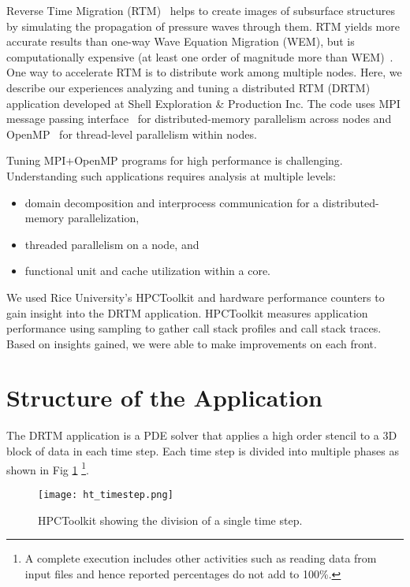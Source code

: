\documentclass[conference]{IEEEtran}
\begin{document}
Reverse Time Migration (RTM)~\cite{rtm} helps to create images of subsurface structures by simulating the propagation of pressure waves through them. RTM yields more accurate results than one-way Wave Equation Migration (WEM), but is computationally expensive (at least one order of magnitude more than WEM)~\cite{araya-polo}. One way to accelerate RTM is to distribute work among multiple nodes. Here, we describe our experiences analyzing and tuning a distributed RTM (DRTM) application developed at Shell Exploration \& Production Inc.
The code uses MPI message passing interface~\cite{mpi} for distributed-memory parallelism across nodes and OpenMP~\cite{openmp} for thread-level parallelism within nodes.

Tuning MPI+OpenMP programs for high performance is challenging. Understanding such applications requires analysis at multiple levels: 

\begin{itemize}
    \item domain decomposition and interprocess communication for a distributed-memory parallelization,
    \item threaded parallelism on a node, and
    \item functional unit and cache utilization within a core.
\end{itemize}

We used Rice University's HPCToolkit \cite{hpctoolkit} and hardware performance counters to gain insight into the DRTM application. HPCToolkit measures application performance using sampling to gather call stack profiles and call stack traces.
Based on insights gained, we were able to make improvements on each front.

\section{Structure of the Application}
The DRTM application is a PDE solver that applies a high order stencil to a 3D block of data in each time step. Each time step is divided into multiple phases as shown in Fig \ref{fig:ht_timestep} \footnote{A complete execution includes other activities such as reading data from input files and hence reported percentages do not add to 100\%.}.

\begin{figure}[htb]
    \centering
    \texttt{[image: ht\_timestep.png]}
    \caption{HPCToolkit showing the division of a single time step.}
    \label{fig:ht_timestep}
\end{figure}
\end{document}
